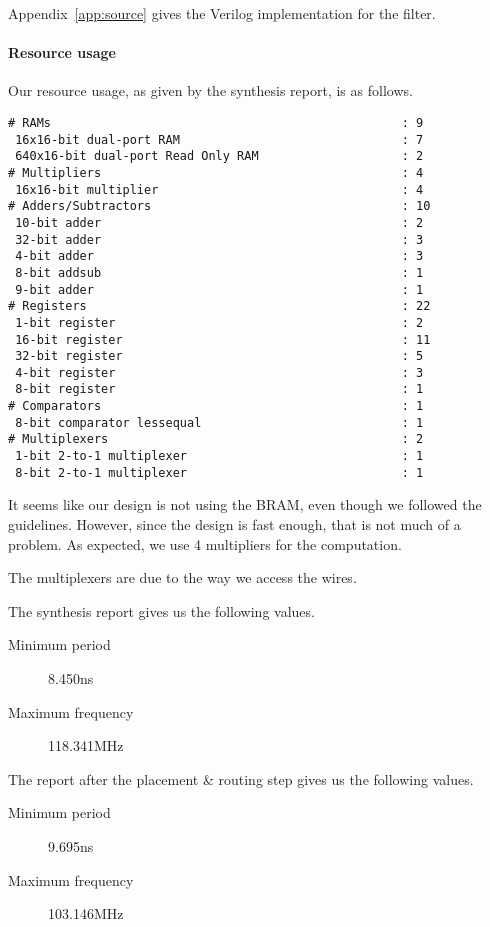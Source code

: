Appendix~\ref{app:source} gives the Verilog implementation for the filter.

\paragraph{Resource usage}
Our resource usage, as given by the synthesis report, is as follows.

\begin{verbatim}
# RAMs                                                 : 9
 16x16-bit dual-port RAM                               : 7
 640x16-bit dual-port Read Only RAM                    : 2
# Multipliers                                          : 4
 16x16-bit multiplier                                  : 4
# Adders/Subtractors                                   : 10
 10-bit adder                                          : 2
 32-bit adder                                          : 3
 4-bit adder                                           : 3
 8-bit addsub                                          : 1
 9-bit adder                                           : 1
# Registers                                            : 22
 1-bit register                                        : 2
 16-bit register                                       : 11
 32-bit register                                       : 5
 4-bit register                                        : 3
 8-bit register                                        : 1
# Comparators                                          : 1
 8-bit comparator lessequal                            : 1
# Multiplexers                                         : 2
 1-bit 2-to-1 multiplexer                              : 1
 8-bit 2-to-1 multiplexer                              : 1
\end{verbatim}

It seems like our design is not using the BRAM, even though we followed the guidelines.
However, since the design is fast enough, that is not much of a problem.
As expected, we use 4 multipliers for the computation.

The multiplexers are due to the way we access the wires.

The synthesis report gives us the following values.
\begin{description}
	\item[Minimum period] 8.450ns
	\item[Maximum frequency] 118.341MHz
\end{description}

The report after the placement \& routing step gives us the following values.
\begin{description}
	\item[Minimum period] 9.695ns
	\item[Maximum frequency] 103.146MHz
\end{description}
